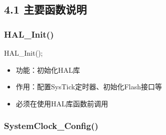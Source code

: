 \documentclass[
  chinese,
  UTF8,
  oneside,
  openany]{ctexbook}
\newenvironment{Shaded}{}{}
\newcommand{\NormalTok}[1]{#1}
\newcommand{\OperatorTok}[1]{\textcolor[rgb]{0.40,0.40,0.40}{#1}}
\providecommand{\tightlist}{%
  \setlength{\itemsep}{0pt}\setlength{\parskip}{0pt}}
\begin{document}
\subsection{4.1
主要函数说明}\label{ux4e3bux8981ux51fdux6570ux8bf4ux660e}

\subsubsection{HAL\_Init()}\label{hal_init}

\begin{Shaded}
\begin{Highlighting}[]
\NormalTok{HAL\_Init}\OperatorTok{();}
\end{Highlighting}
\end{Shaded}

\begin{itemize}
\tightlist
\item
  功能：初始化HAL库
\item
  作用：配置SysTick定时器、初始化Flash接口等
\item
  必须在使用HAL库函数前调用
\end{itemize}

\subsubsection{SystemClock\_Config()}\label{systemclock_config}
\end{document}

